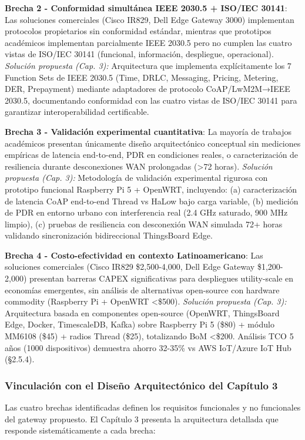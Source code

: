 \textbf{Brecha 2 - Conformidad simultánea IEEE 2030.5 + ISO/IEC 30141}: Las soluciones comerciales (Cisco IR829, Dell Edge Gateway 3000) implementan protocolos propietarios sin conformidad estándar, mientras que prototipos académicos implementan parcialmente IEEE 2030.5 pero no cumplen las cuatro vistas de ISO/IEC 30141 (funcional, información, despliegue, operacional). \textit{Solución propuesta (Cap. 3):} Arquitectura que implementa explícitamente los 7 Function Sets de IEEE 2030.5 (Time, DRLC, Messaging, Pricing, Metering, DER, Prepayment) mediante adaptadores de protocolo CoAP/LwM2M→IEEE 2030.5, documentando conformidad con las cuatro vistas de ISO/IEC 30141 para garantizar interoperabilidad certificable.

\textbf{Brecha 3 - Validación experimental cuantitativa}: La mayoría de trabajos académicos presentan únicamente diseño arquitectónico conceptual sin mediciones empíricas de latencia end-to-end, PDR en condiciones reales, o caracterización de resiliencia durante desconexiones WAN prolongadas (>72 horas). \textit{Solución propuesta (Cap. 3):} Metodología de validación experimental rigurosa con prototipo funcional Raspberry Pi 5 + OpenWRT, incluyendo: (a) caracterización de latencia CoAP end-to-end Thread vs HaLow bajo carga variable, (b) medición de PDR en entorno urbano con interferencia real (2.4 GHz saturado, 900 MHz limpio), (c) pruebas de resiliencia con desconexión WAN simulada 72+ horas validando sincronización bidireccional ThingsBoard Edge.

\textbf{Brecha 4 - Costo-efectividad en contexto Latinoamericano}: Las soluciones comerciales (Cisco IR829 \$2,500-4,000, Dell Edge Gateway \$1,200-2,000) presentan barreras CAPEX significativas para despliegues utility-scale en economías emergentes, sin análisis de alternativas open-source con hardware commodity (Raspberry Pi + OpenWRT <\$500). \textit{Solución propuesta (Cap. 3):} Arquitectura basada en componentes open-source (OpenWRT, ThingsBoard Edge, Docker, TimescaleDB, Kafka) sobre Raspberry Pi 5 (\$80) + módulo MM6108 (\$45) + radios Thread (\$25), totalizando BoM <\$200. Análisis TCO 5 años (1000 dispositivos) demuestra ahorro 32-35\% vs AWS IoT/Azure IoT Hub (§2.5.4).

\subsubsection{Vinculación con el Diseño Arquitectónico del Capítulo 3}

Las cuatro brechas identificadas definen los requisitos funcionales y no funcionales del gateway propuesto. El Capítulo 3 presenta la arquitectura detallada que responde sistemáticamente a cada brecha:

